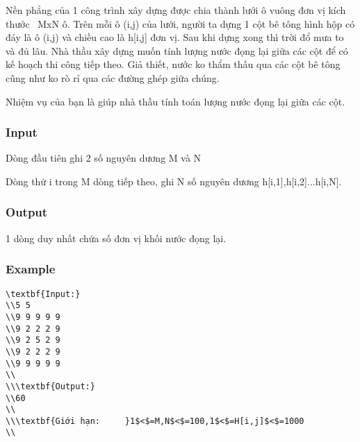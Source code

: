 



   Nền phẳng của 1 công trình xây dựng được chia thành lưới ô vuông đơn vị kích thước  MxN ô. Trên mỗi ô (i,j) của lưới, người ta dựng 1 cột bê tông hình hộp có đáy là ô (i,j) và chiều cao là h[i,j] đơn vị. Sau khi dựng xong thì trời đổ mưa to và đủ lâu. Nhà thầu xây dựng muốn tính lượng nước đọng lại giữa các cột để có kế hoạch thi công tiếp theo. Giả thiết, nước ko thẩm thấu qua các cột bê tông cũng như ko rò rỉ qua các đường ghép giữa chúng.  

   Nhiệm vụ của bạn là giúp nhà thầu tính toán lượng nước đọng lại giữa các cột.  

\subsubsection{   Input  }

   Dòng đầu tiên ghi 2 số nguyên dương M và N  

   Dòng thứ i trong M dòng tiếp theo, ghi N số nguyên dương h[i,1],h[i,2]...h[i,N].  

\subsubsection{   Output  }

   1 dòng duy nhất chứa số đơn vị khối nước đọng lại.  



\subsubsection{   Example  }
\begin{verbatim}
\textbf{Input:}
\\5 5
\\9 9 9 9 9
\\9 2 2 2 9
\\9 2 5 2 9
\\9 2 2 2 9
\\9 9 9 9 9
\\
\\\textbf{Output:}
\\60
\\
\\\textbf{Giới hạn:     }1$<$=M,N$<$=100,1$<$=H[i,j]$<$=1000
\\\end{verbatim}